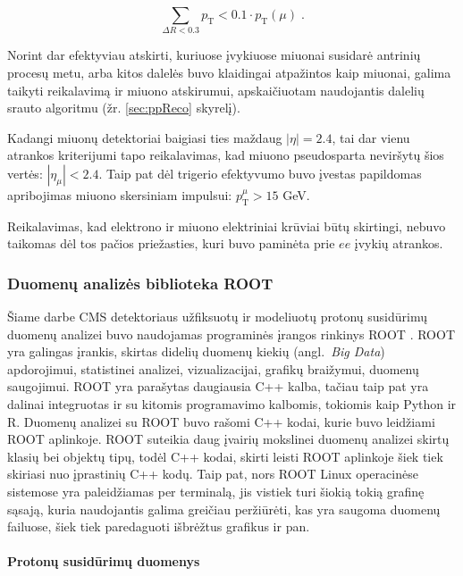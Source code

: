 \documentclass[a4paper, 12pt]{article}
\newlength\q
\begin{document}
\begin{equation*}
\sum_{\Delta R<0.3}p_{\mathrm{T}}<0.1\cdot p_{\mathrm{T}}(\mu) \; .
\end{equation*}

Norint dar efektyviau atskirti, kuriuose įvykiuose miuonai susidarė antrinių procesų metu, arba kitos dalelės buvo klaidingai atpažintos kaip miuonai, galima taikyti reikalavimą ir miuono atskirumui, apskaičiuotam naudojantis dalelių srauto algoritmu (žr. \ref{sec:ppReco} skyrelį).

Kadangi miuonų detektoriai baigiasi ties maždaug $|\eta|=2.4$, tai dar vienu atrankos kriterijumi tapo reikalavimas, kad miuono pseudosparta neviršytų šios vertės: $|\eta_{\mu}|<2.4$. Taip pat dėl trigerio efektyvumo buvo įvestas papildomas apribojimas miuono skersiniam impulsui: $p_{\mathrm{T}}^{\mu}>15$ GeV.

Reikalavimas, kad elektrono ir miuono elektriniai krūviai būtų skirtingi, nebuvo taikomas dėl tos pačios priežasties, kuri buvo paminėta prie $ee$ įvykių atrankos.

\subsubsection{Duomenų analizės biblioteka ROOT}

\vspace{-0.2cm}
Šiame darbe CMS detektoriaus užfiksuotų ir modeliuotų protonų susidūrimų duomenų analizei buvo naudojamas programinės įrangos rinkinys ROOT \cite{ROOT}. ROOT yra galingas įrankis, skirtas didelių duomenų kiekių (angl.\ \textit{Big Data}) apdorojimui, statistinei analizei, vizualizacijai, grafikų braižymui, duomenų saugojimui. ROOT yra parašytas daugiausia C++ kalba, tačiau taip pat yra dalinai integruotas ir su kitomis programavimo kalbomis, tokiomis kaip Python ir R. Duomenų analizei su ROOT buvo rašomi C++ kodai, kurie buvo leidžiami ROOT aplinkoje. ROOT suteikia daug įvairių mokslinei duomenų analizei skirtų klasių bei objektų tipų, todėl C++ kodai, skirti leisti ROOT aplinkoje šiek tiek skiriasi nuo įprastinių C++ kodų. Taip pat, nors ROOT Linux operacinėse sistemose yra paleidžiamas per terminalą, jis vistiek turi šiokią tokią grafinę sąsają, kuria naudojantis galima greičiau peržiūrėti, kas yra saugoma duomenų failuose, šiek tiek paredaguoti išbrėžtus grafikus ir pan.

\paragraph{Protonų susidūrimų duomenys\\}
\end{document}
